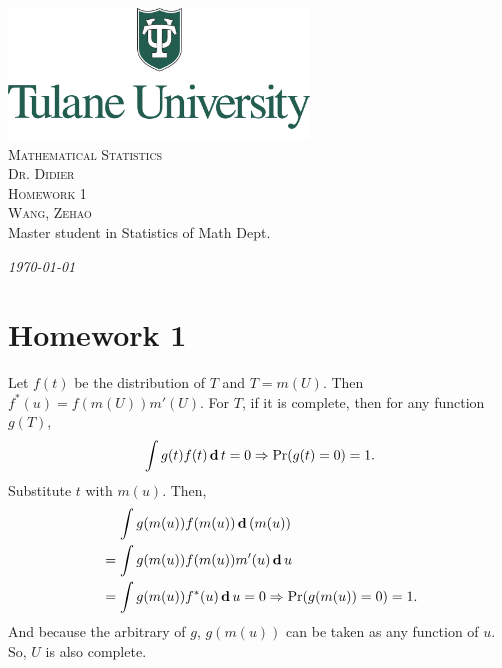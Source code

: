 \documentclass[12pt]{article}
\newcommand{\CN}{Mathematical Statistics}
\newcommand{\Ti}{Homework 1}
\newcommand{\Pf}{Dr. Didier}
\newcommand{\FN}{Zehao}
\newcommand{\LN}{Wang}
\begin{document}
\begin{titlepage}
    \begin{center}    
    \includegraphics[width=0.6\textwidth]{Tulane.png}\\[1cm]    
    
    \textsc{\Huge \CN}\\[0.5cm]
    \textsc{\large \Pf}\\[1.0cm]
    
    \textsc{\LARGE \Ti}\\[0.5cm]
    \textsc{\large \LN, \FN}\\
    {Master student in Statistics of Math Dept.}
    
    
    \vfill
    
    {\Large \emph{\today}}
    
    \end{center}
\end{titlepage}
    
    \setcounter{section}{1}    

    \section*{\Ti}

    \begin{solution}
        Let $f(t)$ be the distribution of $T$ and $T=m(U)$. Then $f^*(u)=f(m(U))m'(U)$. For $T$, if it is complete, then for any function $g(T)$, 
        \[
            \int g(t)f(t)\,\mathbf{d}\, t=0 \Rightarrow \Pr(g(t)=0)=1. 
        \]
        Substitute $t$ with $m(u)$. Then, 
        \[
            \begin{aligned}
                &\quad\,\int g(m(u))f(m(u))\,\mathbf{d}\, (m(u))\\
                &=\int g(m(u))f(m(u))m'(u)\,\mathbf{d}\, u\\
                &=\int g(m(u))f^*(u)\,\mathbf{d}\, u=0\Rightarrow \Pr(g(m(u))=0)=1. 
            \end{aligned}
        \]
        And because the arbitrary of $g$, $g(m(u))$ can be taken as any function of $u$. So, $U$ is also complete. 
    \end{solution}
    
\end{document}
